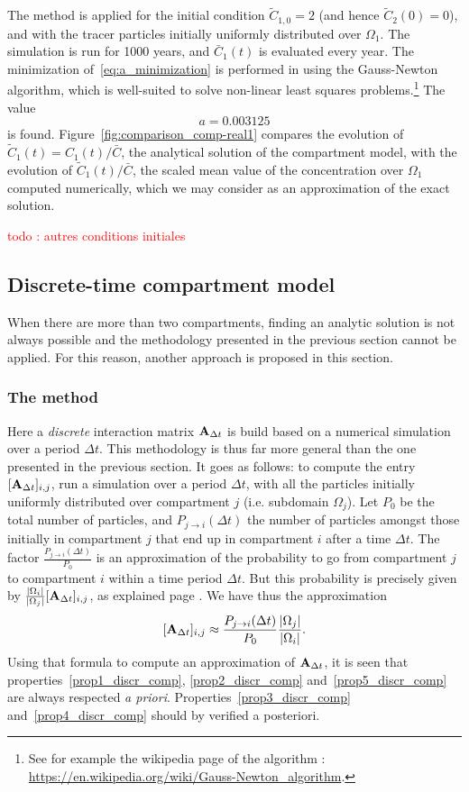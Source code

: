 The method is applied for the initial condition $\tilde C_{1,0} = 2$ (and hence $\tilde C_2(0) = 0$), and with the tracer particles initially uniformly distributed over $\Omega_1$. The simulation is run for 1000 years, and $\bar C_1(t)$ is evaluated every year. The minimization of~\eqref{eq:a_minimization} is performed in \matlab using the Gauss-Newton algorithm, which is well-suited to solve non-linear least squares problems.\footnote{See for example the wikipedia page of the algorithm : \url{https://en.wikipedia.org/wiki/Gauss-Newton_algorithm}.} The value 
\begin{equation}
	a = 0.003125
\end{equation}
is found. Figure~\ref{fig:comparison_comp-real1} compares the evolution of $\tilde C_1(t) = C_1(t)/\bar C$, the analytical solution of the compartment model, with the evolution of $\tilde C_1(t)/\bar C$, the scaled mean value of the concentration over $\Omega_1$ computed numerically, which we may consider as an approximation of the exact solution.

\textcolor{red}{todo : autres conditions initiales}

\subsection{Discrete-time compartment model} \label{sec:dtcm}
When there are more than two compartments, finding an analytic solution is not always possible and the methodology presented in the previous section cannot be applied. For this reason, another approach is proposed in this section. 
\subsubsection{The method}
Here a \textit{discrete} interaction matrix $\mathbf A_{\Delta t}$ is build based on a numerical simulation over a period $\Delta t$. This methodology is thus far more general than the one presented in the previous section. It goes as follows: to compute the entry $[\mathbf A_{\Delta t}]_{i,j}$, run a simulation over a period $\Delta t$, with all the particles initially uniformly distributed over compartment $j$ (i.e. subdomain $\Omega_j$). Let $P_0$ be the total number of particles, and $P_{j \rightarrow i}(\Delta t)$ the number of particles amongst those initially in compartment $j$ that end up in compartment $i$ after a time $\Delta t$. The factor $\frac{P_{j \rightarrow i}(\Delta t)}{P_0}$ is an approximation of the probability to go from compartment $j$ to compartment $i$ within a time period $\Delta t$. But this probability is precisely given by $\frac{|\Omega_i|}{|\Omega_j|}[\mathbf A_{\Delta t}]_{i,j}$, as explained page \pageref{page:probability_interpretation}. We have thus the approximation
\begin{equation} \label{eq:A_approx_discr}
	[\mathbf A_{\Delta t}]_{i,j} \approx \frac{P_{j \rightarrow i}(\Delta t)}{P_0}\frac{|\Omega_j|}{|\Omega_i|}.
\end{equation}
Using that formula to compute an approximation of $\mathbf A_{\Delta t}$, it is seen that properties~\ref{prop1_discr_comp}, \ref{prop2_discr_comp} and~\ref{prop5_discr_comp} are always respected \textit{a priori}. Properties~\ref{prop3_discr_comp} and~\ref{prop4_discr_comp} should by verified a posteriori.
